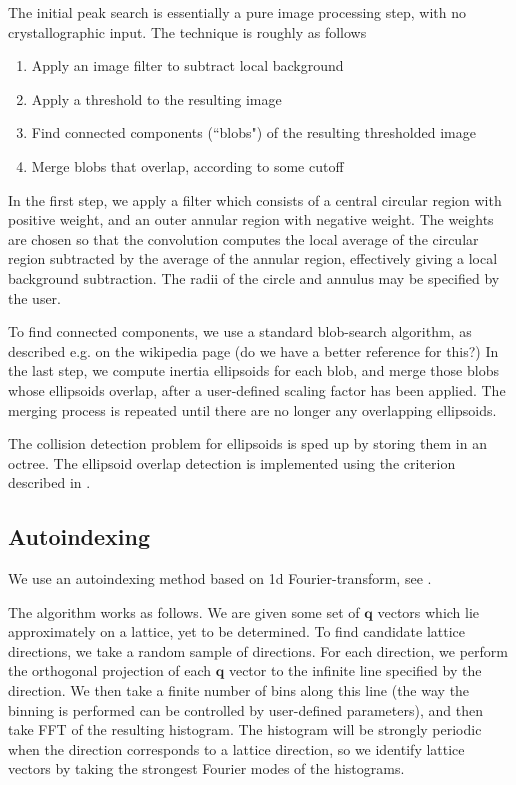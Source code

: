 \documentclass[11pt,a4paper]{article}
\def\v#1{\bm{{#1}}}
\def\q{{\v{q}}}
\begin{document}
The initial peak search is essentially a pure image processing step, with no crystallographic
input. The technique is roughly as follows
\begin{enumerate}
  \item Apply an image filter to subtract local background
  \item Apply a threshold to the resulting image
  \item Find connected components (``blobs") of the resulting thresholded image
  \item Merge blobs that overlap, according to some cutoff
\end{enumerate}

In the first step, we apply a filter which consists of a central circular region with positive weight,
and an outer annular region with negative weight. The weights are chosen so that the convolution
computes the local average of the circular region subtracted by the average of the annular region,
effectively giving a local background subtraction. The radii of the circle and annulus may be
specified by the user.

To find connected components, we use a standard blob-search algorithm, as described e.g. on the
wikipedia page (do we have a better reference for this?) In the last step, we compute inertia
ellipsoids for each blob, and merge those blobs whose ellipsoids overlap, after a user-defined
scaling factor has been applied. The merging process is repeated until there are no longer any
overlapping ellipsoids.

The collision detection problem for ellipsoids is sped up by storing them in an octree. The
ellipsoid overlap detection is implemented using the criterion described in \cite{ellipsoid-collision}.


\subsection{Autoindexing} \label{autoindex}

We use an autoindexing method based on 1d Fourier-transform, see \cite{StBR97,SaGA04}.

The algorithm works as follows. We are given some set of $\q$ vectors which lie approximately on
a lattice, yet to be determined. To find candidate lattice directions, we take a random sample of
directions. For each direction, we perform the orthogonal projection of each $\q$ vector to the
infinite line specified by the direction. We then take a finite number of bins along this line
(the way the binning is performed can be controlled by user-defined parameters), and then take
FFT of the resulting histogram. The histogram will be strongly periodic when the direction corresponds
to a lattice direction, so we identify lattice vectors by taking the strongest Fourier modes of
the histograms.
\end{document}
